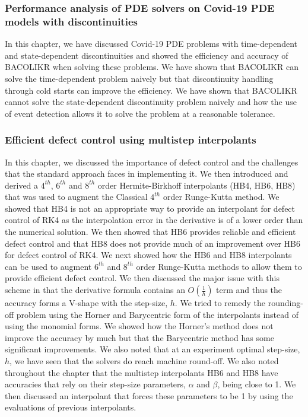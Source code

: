 \documentclass{article}
\begin{document}
\subsubsection{Performance analysis of PDE solvers on Covid-19 PDE models with discontinuities}
In this chapter, we have discussed Covid-19 PDE problems with time-dependent and state-dependent discontinuities and showed the efficiency and accuracy of BACOLIKR when solving these problems. We have shown that BACOLIKR can solve the time-dependent problem naively but that discontinuity handling through cold starts can improve the efficiency. We have shown that BACOLIKR cannot solve the state-dependent discontinuity problem naively and how the use of event detection allows it to solve the problem at a reasonable tolerance.  

\subsubsection{Efficient defect control using multistep interpolants}
In this chapter, we discussed the importance of defect control and the challenges that the standard approach faces in implementing it. We then introduced and derived a $4^{th}$, $6^{th}$ and $8^{th}$ order Hermite-Birkhoff interpolants (HB4, HB6, HB8) that was used to augment the Classical $4^{th}$ order Runge-Kutta method. We showed that HB4 is not an appropriate way to provide an interpolant for defect control of RK4 as the interpolation error in the derivative is of a lower order than the numerical solution. We then showed that HB6 provides reliable and efficient defect control and that HB8 does not provide much of an improvement over HB6 for defect control of RK4. We next showed how the HB6 and HB8 interpolants can be used to augment $6^{th}$ and $8^{th}$ order Runge-Kutta methods to allow them to provide efficient defect control. We then discussed the major issue with this scheme in that the derivative formula contains an $O(\frac{1}{h})$ term and thus the accuracy forms a V-shape with the step-size, $h$. We tried to remedy the rounding-off problem using the Horner and Barycentric form of the interpolants instead of using the monomial forms. We showed how the Horner's method does not improve the accuracy by much but that the Barycentric method has some significant improvements. We also noted that at an experiment optimal step-size, $h$, we have seen that the solvers do reach machine round-off. We also noted throughout the chapter that the multistep interpolants HB6 and HB8 have accuracies that rely on their step-size parameters, $\alpha$ and $\beta$, being close to 1. We then discussed an interpolant that forces these parameters to be 1 by using the evaluations of previous interpolants.
\end{document}
